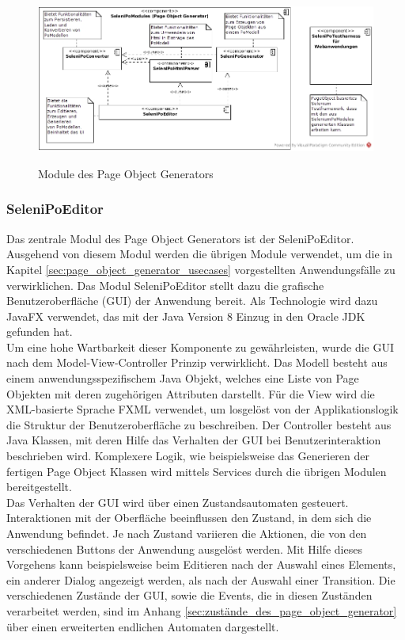 \begin{figure}[htb]
  \centering  
  \includegraphics[scale=0.46]{img/ComponentDiagram.jpg}\\
  \caption{Module des Page Object Generators}
  \label{fig:component_diagramm}
\end{figure}

\subsubsection{SeleniPoEditor}
\label{sec:selenipoeditor}

Das zentrale Modul des Page Object Generators ist der SeleniPoEditor.
Ausgehend von diesem Modul werden die übrigen Module verwendet, um die in Kapitel \ref{sec:page_object_generator_usecases} vorgestellten Anwendungsfälle zu verwirklichen.
Das Modul SeleniPoEditor stellt dazu die grafische Benutzeroberfläche (GUI) der Anwendung bereit.
Als Technologie wird dazu JavaFX \cite{oracle_client_2015} verwendet, das mit der Java Version 8 Einzug in den Oracle JDK gefunden hat. \\
Um eine hohe Wartbarkeit dieser Komponente zu gewährleisten, wurde die GUI nach dem Model-View-Controller Prinzip verwirklicht.
Das Modell besteht aus einem anwendungsspezifischem Java Objekt, welches eine Liste von Page Objekten mit deren zugehörigen Attributen darstellt.
Für die View wird die XML-basierte Sprache FXML verwendet, um losgelöst von der Applikationslogik die Struktur der Benutzeroberfläche zu beschreiben.
Der Controller besteht aus Java Klassen, mit deren Hilfe das Verhalten der GUI bei Benutzerinteraktion beschrieben wird.
Komplexere Logik, wie beispielsweise das Generieren der fertigen Page Object Klassen wird mittels Services durch die übrigen Modulen bereitgestellt.\\
Das Verhalten der GUI wird über einen Zustandsautomaten gesteuert.
Interaktionen mit der Oberfläche beeinflussen den Zustand, in dem sich die Anwendung befindet. Je nach Zustand variieren die Aktionen, die von den verschiedenen Buttons der Anwendung ausgelöst werden.
Mit Hilfe dieses Vorgehens kann beispielsweise beim Editieren nach der Auswahl eines Elements, ein anderer Dialog angezeigt werden, als nach der Auswahl einer Transition.
Die verschiedenen Zustände der GUI, sowie die Events, die in diesen Zuständen verarbeitet werden, sind im Anhang \ref{sec:zustände_des_page_object_generator} über einen erweiterten endlichen Automaten dargestellt.

